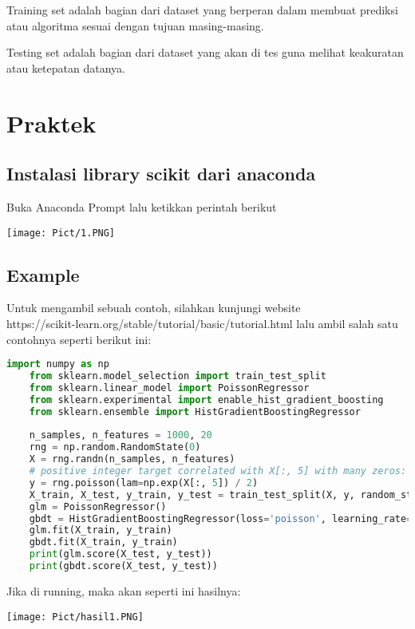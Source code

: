 \documentclass{homework}
\begin{document}
Training set adalah bagian dari dataset yang berperan dalam membuat prediksi atau algoritma sesuai dengan tujuan masing-masing.

Testing set adalah bagian dari dataset yang akan di tes guna melihat keakuratan atau ketepatan datanya.

\section{Praktek}
\subsection{Instalasi library scikit dari anaconda}
Buka Anaconda Prompt lalu ketikkan perintah berikut
\begin{center}
    \texttt{[image: Pict/1.PNG]}
\end{center}
    
\subsection{Example}
Untuk mengambil sebuah contoh, silahkan kunjungi website\\ https://scikit-learn.org/stable/tutorial/basic/tutorial.html lalu ambil salah satu contohnya seperti berikut ini:
\begin{lstlisting}[language=Python]
    import numpy as np
    from sklearn.model_selection import train_test_split
    from sklearn.linear_model import PoissonRegressor
    from sklearn.experimental import enable_hist_gradient_boosting 
    from sklearn.ensemble import HistGradientBoostingRegressor
    
    n_samples, n_features = 1000, 20
    rng = np.random.RandomState(0)
    X = rng.randn(n_samples, n_features)
    # positive integer target correlated with X[:, 5] with many zeros:
    y = rng.poisson(lam=np.exp(X[:, 5]) / 2)
    X_train, X_test, y_train, y_test = train_test_split(X, y, random_state=rng)
    glm = PoissonRegressor()
    gbdt = HistGradientBoostingRegressor(loss='poisson', learning_rate=.01)
    glm.fit(X_train, y_train)
    gbdt.fit(X_train, y_train)
    print(glm.score(X_test, y_test))
    print(gbdt.score(X_test, y_test))
\end{lstlisting}
Jika di running, maka akan seperti ini hasilnya:
\begin{center}
    \texttt{[image: Pict/hasil1.PNG]}
\end{center}
\end{document}
